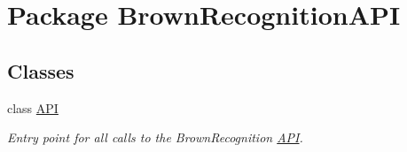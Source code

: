 \hypertarget{namespace_brown_recognition_a_p_i}{
\section{\-Package \-Brown\-Recognition\-A\-P\-I}
\label{namespace_brown_recognition_a_p_i}
}
\subsection*{\-Classes}
\begin{DoxyCompactItemize}
\item 
class \hyperlink{class_brown_recognition_a_p_i_1_1_a_p_i}{\-A\-P\-I}
\begin{DoxyCompactList}\small\item\em \-Entry point for all calls to the \-Brown\-Recognition \hyperlink{class_brown_recognition_a_p_i_1_1_a_p_i}{\-A\-P\-I}. \end{DoxyCompactList}\end{DoxyCompactItemize}
